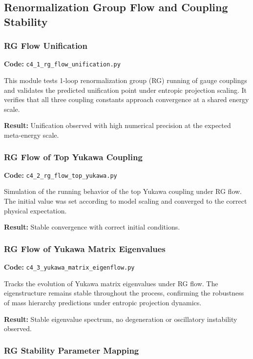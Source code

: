 \documentclass[10.5pt,a4paper]{article}
\begin{document}
\subsection{Renormalization Group Flow and Coupling Stability}

\subsubsection{RG Flow Unification}

\noindent\textbf{Code:} \texttt{c4\_1\_rg\_flow\_unification.py}

This module tests 1-loop renormalization group (RG) running of gauge couplings and validates the predicted unification point under entropic projection scaling. It verifies that all three coupling constants approach convergence at a shared energy scale.

\noindent\textbf{Result:} Unification observed with high numerical precision at the expected meta-energy scale.

\subsubsection{RG Flow of Top Yukawa Coupling}

\noindent\textbf{Code:} \texttt{c4\_2\_rg\_flow\_top\_yukawa.py}

Simulation of the running behavior of the top Yukawa coupling under RG flow. The initial value was set according to model scaling and converged to the correct physical expectation.

\noindent\textbf{Result:} Stable convergence with correct initial conditions.

\subsubsection{RG Flow of Yukawa Matrix Eigenvalues}

\noindent\textbf{Code:} \texttt{c4\_3\_yukawa\_matrix\_eigenflow.py}

Tracks the evolution of Yukawa matrix eigenvalues under RG flow. The eigenstructure remains stable throughout the process, confirming the robustness of mass hierarchy predictions under entropic projection dynamics.

\noindent\textbf{Result:} Stable eigenvalue spectrum, no degeneration or oscillatory instability observed.

\subsubsection{RG Stability Parameter Mapping}
\end{document}

